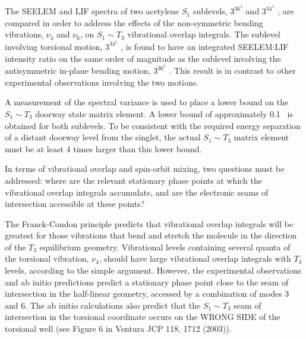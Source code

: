 \documentclass[12pt]{mitthesis}
\begin{document}
The SEELEM and LIF spectra of two acetylene $S_1$ sublevels, $3^36^1$
 and $3^34^1$ , are compared in order to address the
effects of the non-symmetric bending vibrations, $\nu_4$ and $\nu_6$,
on $S_1 \sim T_3$ vibrational overlap integrals.  The sublevel
involving torsional motion, $3^34^1$ , is found to have an
integrated SEELEM:LIF intensity ratio on the same order of magnitude
as the sublevel involving the antisymmetric in-plane bending motion,
$3^36^1$ .  This result is in contrast to other experimental
observations involving the two motions.  

A measurement of the spectral variance is used to place a lower bound
on the $S_1 \sim T_3$ doorway state matrix element.  A lower bound of
approximately 0.1 \rcm\ is obtained for both sublevels.  To be
consistent with the required energy separation of a distant doorway
level from the singlet, the actual $S_1 \sim T_3$ matrix element must
be at least 4 times larger than this lower bound.


In terms of vibrational overlap and spin-orbit mixing, two questions
must be addressed: where are the relevant stationary phase points
at which the vibrational overlap integrals accumulate, and are the
electronic seams of intersection accessible at these points?  

The Franck-Condon principle predicts that vibrational overlap
integrals will be greatest for those vibrations that bend and stretch
the molecule in the direction of the $T_3$ equilibrium geometry.
Vibrational levels containing several quanta of the torsional
vibration, $\nu_4$, should have large vibrational overlap integrals
with $T_3$ levels, according to the simple argument.  However, the
experimental observations and ab initio predictions predict a
stationary phase point close to the seam of intersection in the
half-linear geometry, accessed by a combination of modes 3 and 6.  The
ab initio calculations also predict that the $S_1 \sim T_3$ seam of
intersection in the torsional coordinate occurs on the WRONG SIDE of
the torsional well (see Figure 6 in Ventura JCP 118, 1712 (2003)).
\end{document}
